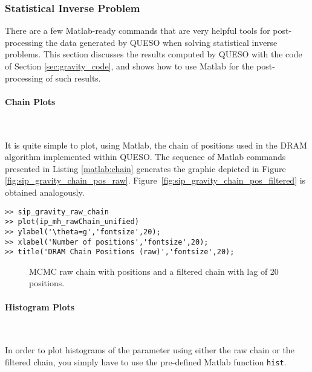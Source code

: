 \subsubsection{Statistical Inverse Problem}

There are a few Matlab-ready commands that are very helpful tools for post-processing the data
generated by QUESO when solving statistical inverse problems.
This section discusses the results computed by QUESO with the code of Section
\ref{sec:gravity_code}, and shows how to use Matlab for the post-processing of such results.

\paragraph{Chain Plots}\

It is quite simple to plot, using Matlab, the chain of positions used in the DRAM algorithm
implemented within QUESO.
The sequence of Matlab commands presented in Listing \ref{matlab:chain} generates the
graphic depicted in Figure \ref{fig:sip_gravity_chain_pos_raw}.
Figure~\ref{fig:sip_gravity_chain_pos_filtered} is obtained analogously.

\begin{lstlisting}[label=matlab:chain,caption={Matlab code for the chain plot.}]
% inside Matlab
>> sip_gravity_raw_chain
>> plot(ip_mh_rawChain_unified)
>> ylabel('\theta=g','fontsize',20);
>> xlabel('Number of positions','fontsize',20);
>> title('DRAM Chain Positions (raw)','fontsize',20);
\end{lstlisting}

\begin{figure}[p]
\centering
{}
\vspace*{-10pt}
\caption{MCMC raw chain with \chainsizeresults{} positions and a filtered chain with lag of 20 positions.}
\end{figure}

\paragraph{Histogram Plots}\

In order to plot histograms of the parameter using either the raw chain or the filtered chain,
you simply have to use the pre-defined Matlab function \verb+hist+.

